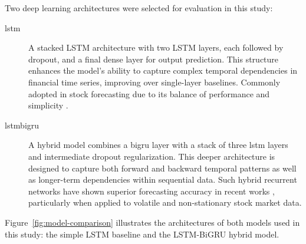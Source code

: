 Two deep learning architectures were selected for evaluation in this study: 

\begin{description}
    \item[\acrshort{lstm}] A stacked LSTM architecture with two LSTM layers, each followed by dropout, and a final dense 
    layer for output prediction. This structure enhances the model's ability to capture complex temporal dependencies in 
    financial time series, improving over single-layer baselines. Commonly adopted in stock forecasting due to its balance 
    of performance and simplicity \parencite{parmar2018stock, phuoc2024StockPrediction}.
    \item[\acrshort{lstmbigru}] A hybrid model combines a \acrshort{bigru} layer with a stack of three
    \acrshort{lstm} layers and intermediate dropout regularization. This deeper architecture is
    designed to capture both forward and backward temporal patterns as well as longer-term 
    dependencies within sequential data. Such hybrid recurrent networks have shown superior
    forecasting accuracy in recent works
    \parencite{shaban2024SMPDL, chang2024StockPrediction, guo2024LSTMStock}, particularly 
    when applied to volatile and non-stationary stock market data.
\end{description}

Figure~\ref{fig:model-comparison} illustrates the architectures of both models used in this 
study: the simple LSTM baseline and the LSTM-BiGRU hybrid model.

